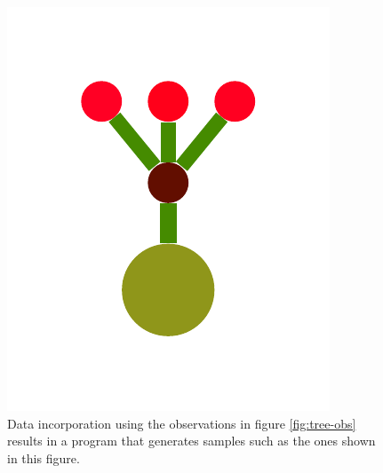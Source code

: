 \documentclass[a4paper,10pt]{article}
\begin{document}
\begin{figure}[t]
  \includegraphics[scale=.26]{./figures/2-2-initProgram-9.pdf}
  \caption{Data incorporation using the observations in figure \ref{fig:tree-obs} results in a program that generates samples such as the ones shown in this figure.}
  \label{fig:initprog}
\end{figure}

\newpage
\end{document}
